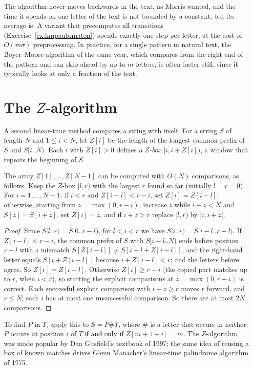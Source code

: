 The algorithm never moves backwards in the text, as Morris wanted, and the time it spends on one letter of the text is not bounded by a constant, but its average is. A variant that precomputes all transitions (Exercise~\ref{ex:kmpautomaton}) spends exactly one step per letter, at the cost of $O(m\sigma)$ preprocessing. In practice, for a single pattern in natural text, the Boyer--Moore algorithm of the same year, which compares from the right end of the pattern and can skip ahead by up to $m$ letters, is often faster still, since it typically looks at only a fraction of the text.

\section{The $Z$-algorithm}\label{sec:zalgo}

A second linear-time method compares a string with itself. For a string $S$ of length $N$ and $1\le i<N$, let $Z[i]$ be the length of the longest common prefix of $S$ and $S[i..N)$. Each $i$ with $Z[i]>0$ defines a \emph{$Z$-box} $[i,i+Z[i])$, a window that repeats the beginning of $S$.

\begin{theorem}\label{thm:zalgo}
The array $Z[1],\dots,Z[N-1]$ can be computed with $O(N)$ comparisons, as follows. Keep the $Z$-box $[l,r)$ with the largest $r$ found so far (initially $l=r=0$). For $i=1,\dots,N-1$: if $i<r$ and $Z[i-l]<r-i$, set $Z[i]=Z[i-l]$; otherwise, starting from $z=\max(0,r-i)$, increase $z$ while $i+z<N$ and $S[z]=S[i+z]$, set $Z[i]=z$, and if $i+z>r$ replace $[l,r)$ by $[i,i+z)$.
\end{theorem}
\begin{proof}
Since $S[l..r)=S[0..r-l)$, for $l<i<r$ we have $S[i..r)=S[i-l..r-l)$. If $Z[i-l]<r-i$, the common prefix of $S$ with $S[i-l..N)$ ends before position $r-l$ with a mismatch $S[Z[i-l]]\ne S[i-l+Z[i-l]]$, and the right-hand letter equals $S[i+Z[i-l]]$ because $i+Z[i-l]<r$; and the letters before agree. So $Z[i]=Z[i-l]$.
Otherwise $Z[i]\ge r-i$ (the copied part matches up to $r$, when $i<r$), so starting the explicit comparisons at $z=\max(0,r-i)$ is correct. Each successful explicit comparison with $i+z\ge r$ moves $r$ forward, and $r\le N$; each $i$ has at most one unsuccessful comparison. So there are at most $2N$ comparisons.
\end{proof}

To find $P$ in $T$, apply this to $S=P\#T$, where $\#$ is a letter that occurs in neither: $P$ occurs at position $i$ of $T$ if and only if $Z[m+1+i]=m$. The $Z$-algorithm was made popular by Dan Gusfield's textbook of 1997; the same idea of reusing a box of known matches drives Glenn Manacher's linear-time palindrome algorithm of 1975.

